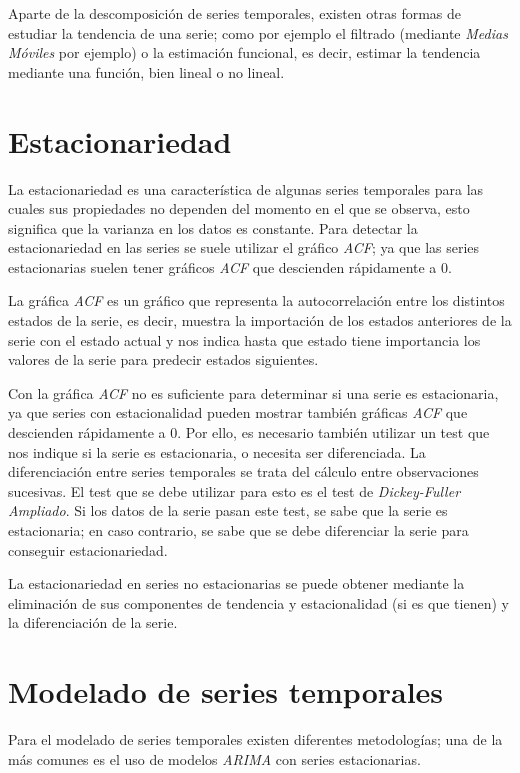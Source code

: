 Aparte de la descomposición de series temporales, existen otras formas de estudiar la tendencia de una serie; como por ejemplo el filtrado (mediante \textit{Medias Móviles} por ejemplo) o la estimación funcional, es decir, estimar la tendencia mediante una función, bien lineal o no lineal.
\section{Estacionariedad}
La estacionariedad es una característica de algunas series temporales para las cuales sus propiedades no dependen del momento en el que se observa, esto significa que la varianza en los datos es constante. Para detectar la estacionariedad en las series se suele utilizar el gráfico \textit{ACF}; ya que las series estacionarias suelen tener gráficos \textit{ACF} que descienden rápidamente a 0.\newline

La gráfica \textit{ACF} es un gráfico que representa la autocorrelación entre los distintos estados de la serie, es decir, muestra la importación de los estados anteriores de la serie con el estado actual y nos indica hasta que estado tiene importancia los valores de la serie para predecir estados siguientes.\newline

Con la gráfica \textit{ACF} no es suficiente para determinar si una serie es estacionaria, ya que series con estacionalidad pueden mostrar también gráficas \textit{ACF} que descienden rápidamente a 0. Por ello, es necesario también utilizar un test que nos indique si la serie es estacionaria, o necesita ser diferenciada. La diferenciación entre series temporales se trata del cálculo entre observaciones sucesivas. El test que se debe utilizar para esto es el test de \textit{Dickey-Fuller Ampliado}. Si los datos de la serie pasan este test,  se sabe que la serie es estacionaria; en caso contrario, se sabe que se debe diferenciar la serie para conseguir estacionariedad. \newline

La estacionariedad en series no estacionarias se puede obtener mediante la eliminación de sus componentes de tendencia y estacionalidad (si es que tienen) y la diferenciación de la serie.
\section{Modelado de series temporales}
Para el modelado de series temporales existen diferentes metodologías; una de la más comunes es el uso de modelos \textit{ARIMA} con series estacionarias.\newline

